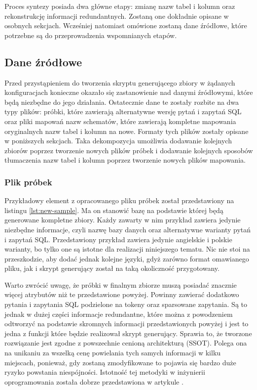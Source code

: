 Proces syntezy posiada dwa główne etapy: zmianę nazw tabel i kolumn oraz rekonstrukcję informacji redundantnych. Zostaną one dokładnie opisane w osobnych sekcjach. Wcześniej natomiast omówione zostaną dane źródłowe, które potrzebne są do przeprowadzenia wspomnianych etapów.

\subsection{Dane źródłowe}
Przed przystąpieniem do tworzenia skryptu generującego zbiory w żądanych konfiguracjach konieczne okazało się zastanowienie nad danymi źródłowymi, które będą niezbędne do jego działania. Ostatecznie dane te zostały rozbite na dwa typy plików: próbki, które zawierają alternatywne wersję pytań i zapytań SQL oraz pliki mapowań nazw schematów, które zawierają kompletne mapowania oryginalnych nazw tabel i kolumn na nowe. Formaty tych plików zostały opisane w poniższych sekcjach. Taka dekompozycja umożliwia dodawanie kolejnych zbiorów poprzez tworzenie nowych plików próbek i dodawanie kolejnych sposobów tłumaczenia nazw tabel i kolumn poprzez tworzenie nowych plików mapowania.

\subsubsection{Plik próbek}
Przykładowy element z opracowanego pliku próbek został przedstawiony na listingu \ref{lst:new-sample}. Ma on stanowić bazę na podstawie której będą generowane kompletne zbiory. Każdy zawarty w nim przykład zawiera jedynie niezbędne informacje, czyli nazwę bazy danych oraz alternatywne warianty pytań i zapytań SQL. Przedstawiony przykład zawiera jedynie angielskie i polskie warianty, bo tylko one są istotne dla realizacji niniejszego tematu. Nic nie stoi na przeszkodzie, aby dodać jednak kolejne języki, gdyż zarówno format omawianego pliku, jak i skrypt generujący został na taką okoliczność przygotowany.

\begin{minipage}{\linewidth}

\end{minipage}

Warto zwrócić uwagę, że próbki w finalnym zbiorze muszą posiadać znacznie więcej atrybutów niż te przedstawione powyżej. Powinny zawierać dodatkowo pytania i zapytania SQL podzielone na tokeny oraz sparsowane zapytania. Są to jednak w dużej części informacje redundantne, które można z powodzeniem odtworzyć na podstawie skromnych informacji przedstawionych powyżej i jest to jedna z funkcji które będzie realizował skrypt generujący. Sprawia to, że tworzone rozwiązanie jest zgodne z powszechnie cenioną architekturą  (SSOT). Polega ona na unikaniu za wszelką cenę powielania tych samych informacji w kilku miejscach, ponieważ, gdy zostaną zmodyfikowane to pojawia się bardzo duże ryzyko powstania niespójności. Istotność tej metodyki w inżynierii oprogramowania została dobrze przedstawiona w artykule  \cite{Pang2014}.

